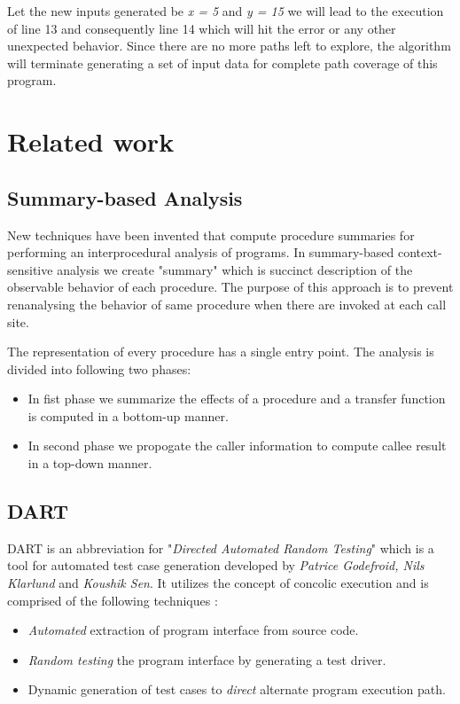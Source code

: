 \documentclass[12pt,oneside]{book}
\begin{document}
Let the new inputs generated be \textit{x = 5} and \textit{y = 15} we will lead to the execution of line 13 and consequently line 14 which will hit the error or any other unexpected behavior. Since there are no more paths left to explore, the algorithm will terminate generating a set of input data for complete path coverage of this program.


\section {Related work}


\subsection {Summary-based Analysis}
New techniques have been invented that compute procedure summaries for performing an interprocedural analysis of programs. In summary-based context-sensitive analysis we create "summary" which is succinct description of the observable behavior of each procedure. The purpose of this approach is to prevent renanalysing the behavior of same procedure when there are invoked at each call site.

The representation of every procedure has a single entry point. The analysis is divided into following two phases:
\begin{itemize}
  \item In fist phase we summarize the effects of a procedure and a transfer function is computed in a bottom-up manner.
  \item  In second phase we propogate the caller information to compute callee result in a top-down manner.
\end{itemize}


\subsection {DART}
DART is an abbreviation for "\textit{Directed Automated Random Testing}" which is a tool for automated test case generation developed by \textit{Patrice Godefroid, Nils Klarlund} and \textit{Koushik Sen}. It utilizes the concept of concolic execution and is comprised of the following techniques :
\begin{itemize}
 \item \textit{Automated} extraction of program interface from source code.
 \item \textit{Random testing} the program interface by generating a test driver. 
 \item Dynamic generation of test cases to \textit{direct} alternate program execution path.
\end{itemize}
\end{document}
